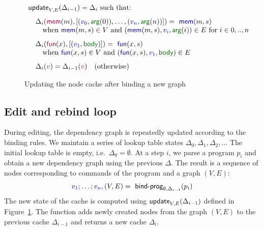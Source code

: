 \documentclass[english,submission]{programming}
\theoremstyle{plain}
\theoremstyle{definition}
\newcommand{\ident}[1]{\textnormal{\textcolor{idclr}{\sffamily #1}}}
\newcommand{\bndclr}[1]{\textcolor{kvdclr}{#1}}
\newcommand{\bkndclr}[1]{\textcolor{prepclr}{#1}}
\newcommand{\bnd}[1]{\textnormal{\textcolor{kvdclr}{\sffamily #1}}}
\newcommand{\bknd}[1]{\textnormal{\textcolor{prepclr}{\sffamily #1}}}
\newcommand{\blbl}[1]{\textnormal{\textcolor{numclr}{\sffamily #1}}}
\begin{document}

\begin{figure}
\vspace{-0.5em}
\begin{equation*}
\begin{array}{l}
\ident{update}_{V,E}(\Delta_{i-1}) = \Delta_i~\textnormal{such that:}
\\[0.75em]
\quad\Delta_{i}(\bknd{mem}(m), [(\bndclr{v_0},\blbl{arg}(0)),\ldots, (\bndclr{v_n},\blbl{arg}(n))]) = \bnd{mem}(m, s)\\
\quad\quad \textnormal{when}~\bnd{mem}(m, s) \in V
~\textnormal{and}~(\bnd{mem}(m, s), \bndclr{v_i}, \blbl{arg}(i)) \in E~\textnormal{for}~i\in 0,..,n
\\[0.75em]
\quad\Delta_{i}(\bknd{fun}(x), [(\bndclr{v_1},\blbl{body})]) = \bnd{fun}(x, s)\\
\quad\quad \textnormal{when}~\bnd{fun}(x, s) \in V
~\textnormal{and}~(\bnd{fun}(x, s), \bndclr{v_1}, \blbl{body}) \in E
\\[0.75em]
\quad\Delta_{i}(\bkndclr{v}) = \Delta_{i-1}(\bkndclr{v})\quad \textnormal{(otherwise)}
\end{array}
\end{equation*}
\vspace{-1em}
\caption{Updating the node cache after binding a new graph}
\label{fig:loop}
\vspace{-0.5em}
\end{figure}


\subsection{Edit and rebind loop}

During editing, the dependency graph is repeatedly updated according to the binding rules.
We maintain a series of lookup table states $\Delta_0, \Delta_1, \Delta_2, \ldots$ The initial
lookup table is empty, i.e.~$\Delta_0 = \emptyset$. At a step $i$, we parse a program $p_i$
and obtain a new dependency graph using the previous $\Delta$. The result is
a sequence of nodes corresponding to commands of the program and a graph $(V, E)$:
%
\begin{equation*}
\bndclr{v_1}; \ldots; \bndclr{v_n}, (V, E) = \ident{bind-prog}_{\emptyset, \Delta_{i-1}}(p_i)
\end{equation*}
%
The new state of the cache is computed using $\ident{update}_{V, E}(\Delta_{i-1})$
defined in Figure~\ref{fig:loop}. The function adds newly created nodes from the graph
$(V, E)$ to the previous cache $\Delta_{i-1}$ and returns a new cache $\Delta_{i}$.
\end{document}
